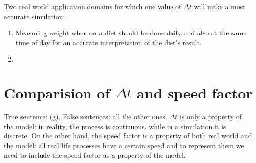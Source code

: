 \documentclass[a4paper]{article}
\begin{document}
Two real world application domains for which one value of $\Delta t$ will make a most accurate simulation:
\begin{enumerate}
\item Measuring weight when on a diet should be done daily and also at the same time of day for an accurate interpretation of the diet's result. 

\item 
\end{enumerate}

\section{Comparision of $\Delta t$ and speed factor}

True sentence: (g). False sentences: all the other ones.
$\Delta t$ is only a property of the model: in reality, the process is continuous, while in a simulation it is discrete. On the other hand, the speed factor is a property of both real world and the model: all real life processes have a certain speed and to represent them we need to include the speed factor as a property of the model.
\end{document}
